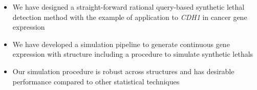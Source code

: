       \begin{itemize}
      \item We have designed a straight-forward rational query-based \gls{synthetic lethal} detection method with the example of application to \textit{CDH1} in cancer \gls{gene expression}
      
      \bigskip
      
      \item We have developed a simulation pipeline to generate continuous \gls{gene expression} with  structure including a procedure to simulate \glspl{synthetic lethal} 
      
      \bigskip
      
      \item Our simulation procedure is robust across  structures and has desirable performance compared to other statistical techniques 
      \end{itemize}
 \fi